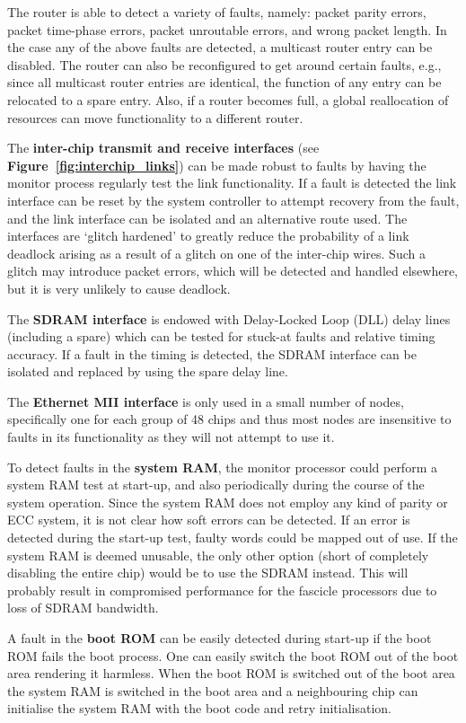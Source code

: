 \documentclass[a4paper, 11pt]{article}
\begin{document}
The router is able to detect a variety of faults, namely: packet parity errors, packet time-phase errors, packet unroutable errors, and wrong packet length. In the case any of the above faults are detected, a multicast router entry can be disabled. The router can also be reconfigured to get around certain faults, e.g., since all multicast router entries are identical, the function of any entry can be relocated to a spare entry. Also, if a router becomes full, a global reallocation of resources can move functionality to a different router.

The \textbf{inter-chip transmit and receive interfaces} (see \textbf{Figure~\ref{fig:interchip_links}}) can be made robust to faults by having the monitor process regularly test the link functionality. If a fault is detected the link interface can be reset by the system controller to attempt recovery from the fault, and the link interface can be isolated and an alternative route used. The interfaces are `glitch hardened' to greatly reduce the probability of a link deadlock arising as a result of a glitch on one of the inter-chip wires. Such a glitch may introduce packet errors, which will be detected and handled elsewhere, but it is very unlikely to cause deadlock.

The \textbf{SDRAM interface} is endowed with Delay-Locked Loop (DLL) delay lines (including a spare) which can be tested for stuck-at faults and relative timing accuracy. If a fault in the timing is detected, the SDRAM interface can be isolated and replaced by using the spare delay line.

The \textbf{Ethernet MII interface} is only used in a small number of nodes, specifically one for each group of 48 chips and thus most nodes are insensitive to faults in its functionality as they will not attempt to use it.

To detect faults in the \textbf{system RAM}, the monitor processor could perform a system RAM test at start-up, and also periodically during the course of the system operation. Since the system RAM does not employ any kind of parity or ECC system, it is not clear how soft errors can be detected. If an error is detected during the start-up test, faulty words could be mapped out of use. If the system RAM is deemed unusable, the only other option (short of completely disabling the entire chip) would be to use the SDRAM instead. This will probably result in compromised performance for the fascicle processors due to loss of SDRAM bandwidth.

A fault in the \textbf{boot ROM} can be easily detected during start-up if the boot ROM fails the boot process. One can easily switch the boot ROM out of the boot area rendering it harmless. When the boot ROM is switched out of the boot area the system RAM is switched in the boot area and a neighbouring chip can initialise the system RAM with the boot code and retry initialisation.
\end{document}

